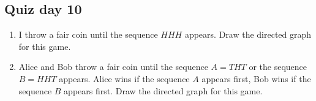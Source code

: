 \documentclass[12pt]{article}
\begin{document}


\subsection*{Quiz day 10}

\begin{enumerate} 
    \item I throw a fair coin until the sequence $HHH$ appears. 
    Draw the directed graph for this game.
    \item Alice and Bob throw a fair coin until the sequence $A = THT$ or the sequence $B = HHT$ appears.
Alice wins if the sequence $A$ appears first, Bob wins if the sequence $B$ appears first.
 Draw the directed graph for this game.
\end{enumerate}
\end{document}
